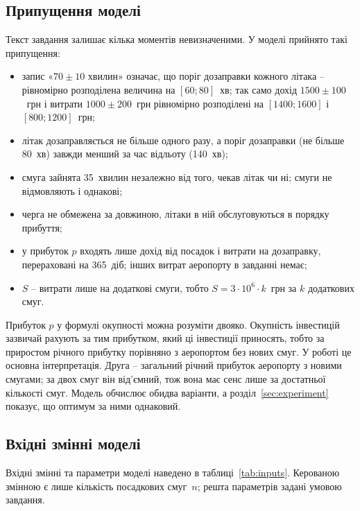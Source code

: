 \subsection{Припущення моделі}

Текст завдання залишає кілька моментів невизначеними. У моделі прийнято такі припущення:
\begin{itemize}
\item запис «$70 \pm 10$ хвилин» означає, що поріг дозаправки кожного літака -- рівномірно розподілена величина на $[60; 80]$~хв; так само дохід $1500 \pm 100$~грн і витрати $1000 \pm 200$~грн рівномірно розподілені на $[1400; 1600]$ і $[800; 1200]$~грн;
\item літак дозаправляється не більше одного разу, а поріг дозаправки (не більше 80~хв) завжди менший за час відльоту (140~хв);
\item смуга зайнята 35~хвилин незалежно від того, чекав літак чи ні; смуги не відмовляють і однакові;
\item черга не обмежена за довжиною, літаки в ній обслуговуються в порядку прибуття;
\item у прибуток $p$ входять лише дохід від посадок і витрати на дозаправку, перераховані на 365~діб; інших витрат аеропорту в завданні немає;
\item $S$ -- витрати лише на додаткові смуги, тобто $S = 3 \cdot 10^6 \cdot k$~грн за $k$ додаткових смуг.
\end{itemize}

Прибуток $p$ у формулі окупності можна розуміти двояко. Окупність інвестицій зазвичай рахують за тим прибутком, який ці інвестиції приносять, тобто за приростом річного прибутку порівняно з аеропортом без нових смуг. У роботі це основна інтерпретація. Друга -- загальний річний прибуток аеропорту з новими смугами; за двох смуг він від'ємний, тож вона має сенс лише за достатньої кількості смуг. Модель обчислює обидва варіанти, а розділ~\ref{sec:experiment} показує, що оптимум за ними однаковий.

\subsection{Вхідні змінні моделі}

Вхідні змінні та параметри моделі наведено в таблиці~\ref{tab:inputs}. Керованою змінною є лише кількість посадкових смуг~$n$; решта параметрів задані умовою завдання.

